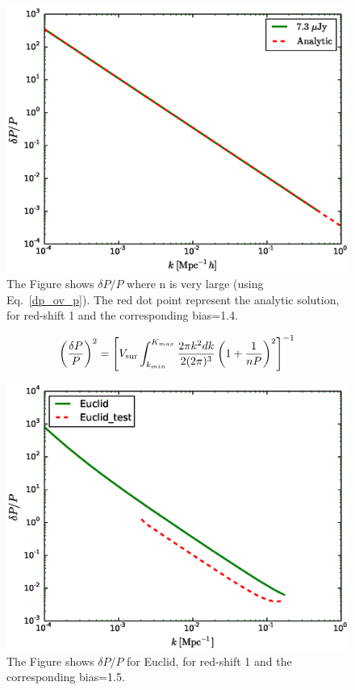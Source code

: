 \documentclass[10pt,a4paper]{article}
\begin{document}
\begin{figure}
\includegraphics[width=1.0\textwidth]{deltaP_ov_p.eps}
\caption{The Figure shows $\delta P/P$ where n is very large (using Eq.~\ref{dp_ov_p}). The red dot point represent the analytic solution, for red-shift 1 and the corresponding bias=1.4.}
\label{fig:cosmic_limit}

\end{figure}



\begin{equation}
\left( \frac{\delta P}{P} \right)^2 =\left[ V_{\rm sur} \int_{k_{min}}^{K_{max}} \frac{ 2 \pi k^2 dk}{2 (2 \pi)^3} \left(1+\frac{1}{nP}\right)^2\right]^{-1}
\end{equation}



\begin{figure}
\includegraphics[width=1.0\textwidth]{deltaP_ov_p_Euclid_2.eps}
\caption{The Figure shows $\delta P/P$  for Euclid, for red-shift 1 and the corresponding bias=1.5.}
\label{fig:cosmic_limit_Euclid_1}
\end{figure}
\end{document}
